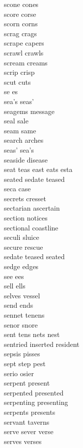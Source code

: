 scone cones\\
score corse\\
scorn corns\\
scrag crags\\
scrape capers\\
scrawl crawls\\
scream creams\\
scrip crisp\\
scut cuts\\
se es\\
sea's seas'\\
seagems message\\
seal sale\\
seam same\\
search arches\\
seas' sea's\\
seaside disease\\
seat teas east eats esta\\
seated sedate teased\\
seca case\\
secrets cresset\\
sectarian ascertain\\
section notices\\
sectional coastline\\
seculi sluice\\
secure rescue\\
sedate teased seated\\
sedge edges\\
see ees\\
sell ells\\
selves vessel\\
send ends\\
sennet tenens\\
senor snore\\
sent tens nets nest\\
sentried inserted resident\\
sepsis pisses\\
sept step pest\\
serio osier\\
serpent present\\
serpented presented\\
serpenting presenting\\
serpents presents\\
servant taverns\\
serve sever verse\\
serves verses\\
